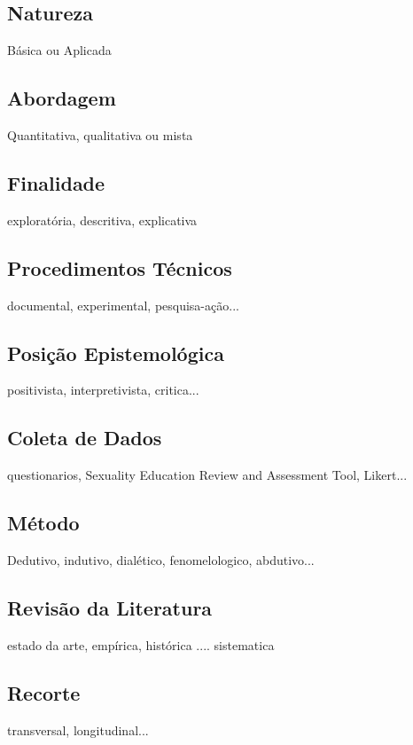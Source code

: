 \subsection{Natureza}\label{sub:natureza}
Básica ou Aplicada

\subsection{Abordagem}\label{sub:abordagem}
Quantitativa, qualitativa ou mista

\subsection{Finalidade}\label{sub:finalidade}
exploratória, descritiva, explicativa

\subsection{Procedimentos Técnicos}\label{sub:procedimentos}
documental, experimental, pesquisa-ação...

\subsection{Posição Epistemológica}\label{sub:posicao}
positivista, interpretivista, critica...

\subsection{Coleta de Dados}\label{sub:coleta}
questionarios, Sexuality Education Review and Assessment Tool, Likert...

\subsection{Método}\label{sub:metodo}
Dedutivo, indutivo, dialético, fenomelologico, abdutivo...

\subsection{Revisão da Literatura}\label{sub:literatura}
estado da arte, empírica, histórica .... sistematica

\subsection{Recorte}\label{sub:recorte}
transversal, longitudinal...

